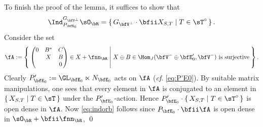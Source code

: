 \documentclass[12pt,a4paper]{amsart}
\numberwithin{equation}{section}
\theoremstyle{remark}
\def\sOR{\sO_\bR}
\def\bfVpe{\bfV^\perp}
\def\bfEz{\bfE_0}
\begin{document}
\medskip

To finish the proof of the lemma, it suffices to show that
\begin{equation}\label{eq:indorb}
\Ind_{P_{\bfEz}}^{G_{\bfVpe}}\sOR = \set{G_{\bfVpe}\cdot \bfii
  \XST|T\in \sT^\circ}.
\end{equation}
Consider the set
\[
\fA :=
\Set{ \begin{pmatrix}
  0 & B^* & C \\
  & X & B\\
  & & 0
\end{pmatrix}\in X + \fnn_\bR|%
\text{$X\oplus  B \in \Hom_J(\bfV^-\oplus \bfE'_0, \bfV^-)$ is surjective} \\
}.
\]
Clearly $P'_{\bfEz}:=\GL_{\bfEz}\ltimes
N_{\bfEz}$ acts on $\fA$ (\emph{cf}. \cref{eq:P'E0}).
By suitable matrix manipulations, one sees that every element in $\fA$ is
conjugated to an element in $\set{X_{S,T}|T\in \sT}$ under the
$P'_{\bfEz}$-action.
Hence $P'_{\bfEz}\cdot \set{X_{S,T}|T\in \sT^\circ}$ is open dense in $\fA$.
Now \cref{eq:indorb} follows since $P_{\bfE_0}\cdot \bfii \fA$ is open dense in $\sOR+ \bfii \fnn_\bR$, \qed
\end{document}
